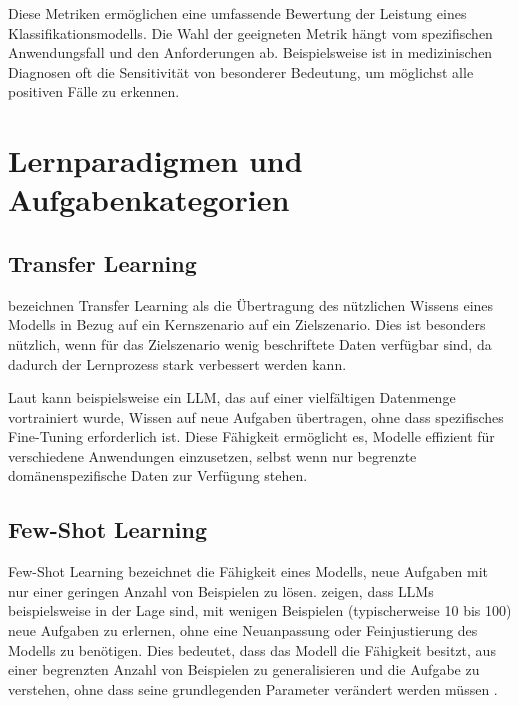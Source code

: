 Diese Metriken ermöglichen eine umfassende Bewertung der Leistung eines Klassifikationsmodells. Die Wahl der geeigneten Metrik hängt vom spezifischen Anwendungsfall und den Anforderungen ab. Beispielsweise ist in medizinischen Diagnosen oft die Sensitivität von besonderer Bedeutung, um möglichst alle positiven Fälle zu erkennen.

\section{Lernparadigmen und Aufgabenkategorien}
\label{sec:lernparadigmen-aufgabenkategorien}

\subsection{Transfer Learning}
\label{subsec:transfer-learning}

\textcite{PanSinnoJialin2010ASoT} bezeichnen Transfer Learning als die Übertragung des nützlichen Wissens eines Modells in Bezug auf ein Kernszenario auf ein Zielszenario. Dies ist besonders nützlich, wenn für das Zielszenario wenig beschriftete Daten verfügbar sind, da dadurch der Lernprozess stark verbessert werden kann.

Laut \textcite{BrownTomB2020LMaF} kann beispielsweise ein \gls{LLM}, das auf einer vielfältigen Datenmenge vortrainiert wurde, Wissen auf neue Aufgaben übertragen, ohne dass spezifisches Fine-Tuning erforderlich ist. Diese Fähigkeit ermöglicht es, Modelle effizient für verschiedene Anwendungen einzusetzen, selbst wenn nur begrenzte domänenspezifische Daten zur Verfügung stehen.

\subsection{Few-Shot Learning}
\label{subsec:few-shot-learning}

Few-Shot Learning bezeichnet die Fähigkeit eines Modells, neue Aufgaben mit nur einer geringen Anzahl von Beispielen zu lösen. \textcite{BrownTomB2020LMaF} zeigen, dass \glspl{LLM} beispielsweise in der Lage sind, mit wenigen Beispielen (typischerweise 10 bis 100) neue Aufgaben zu erlernen, ohne eine Neuanpassung oder Feinjustierung des Modells zu benötigen. Dies bedeutet, dass das Modell die Fähigkeit besitzt, aus einer begrenzten Anzahl von Beispielen zu generalisieren und die Aufgabe zu verstehen, ohne dass seine grundlegenden Parameter verändert werden müssen \parencite{BrownTomB2020LMaF}.

